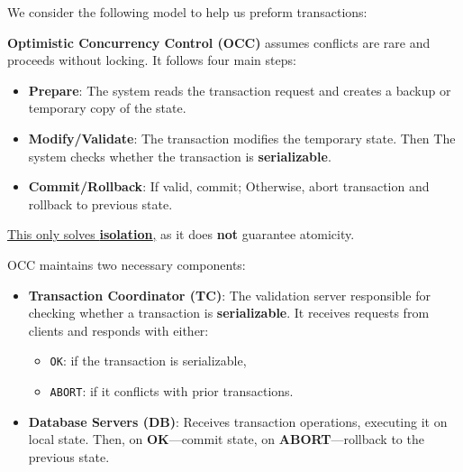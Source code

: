 \noindent
We consider the following model to help us preform transactions:
\begin{Def}

    \textbf{Optimistic Concurrency Control (OCC)} assumes conflicts are rare and proceeds without locking. It follows four main steps:
    
    \begin{itemize}
        \item \textbf{Prepare}: The system reads the transaction request and creates a backup or temporary copy of the state.
        \item \textbf{Modify/Validate}: The transaction modifies the temporary state. Then The system checks whether the transaction is \textbf{serializable}.
        \item \textbf{Commit/Rollback}: If valid, commit; Otherwise, abort transaction and rollback to previous state.
    \end{itemize}
    
    \noindent
    \underline{This only solves \textbf{isolation},} as it does \textbf{not} guarantee atomicity.
    \end{Def}
    \begin{Def}

        OCC maintains two necessary components: 
        
        \begin{itemize}
            \item \textbf{Transaction Coordinator (TC)}: The validation server responsible for checking whether a transaction is \textbf{serializable}. It receives requests from clients and responds with either:
            \begin{itemize}
                \item \texttt{OK}: if the transaction is serializable,
                \item \texttt{ABORT}: if it conflicts with prior transactions.
            \end{itemize}
        
            \item \textbf{Database Servers (DB)}: Receives transaction operations, executing it on local state. Then, on \textbf{OK}---commit state, on \textbf{ABORT}---rollback to the previous state.
        
        \end{itemize}        
        \end{Def}
        
